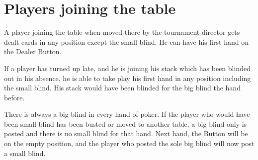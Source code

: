 


\section{Players joining the table}

A player joining the table when moved there by the tournament director
gets dealt cards in any position except the small blind. 
He can have his first hand on the Dealer Button.

If a player has turned up late, and he is joining his stack which has been
blinded out in his absence, he is able to take play his first hand in
any position including the small blind. His stack would have been blinded 
for the big blind the hand before.

There is always a big blind in every hand of poker. If the player who
would have been small blind has been busted or moved to another table,
a big blind only is posted and there is no small blind for that hand.
Next hand, the Button will be on the empty position, and the player
who posted the sole big blind will now post a small blind.

